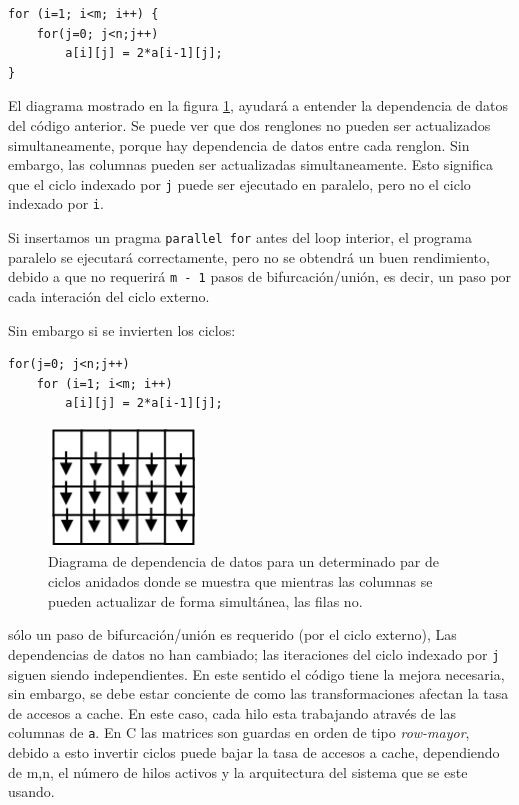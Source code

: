 \documentclass[12pt,letterpaper]{book}
\begin{document}
\begin{lstlisting}[style=C]
for (i=1; i<m; i++) {
	for(j=0; j<n;j++) 
		a[i][j] = 2*a[i-1][j];
}
\end{lstlisting}

El diagrama mostrado en la figura \ref{fig:data_dependence}, ayudará a entender la dependencia de datos del código anterior. Se puede ver que dos renglones no pueden ser actualizados simultaneamente, porque hay dependencia de datos entre cada renglon. Sin embargo, las columnas pueden ser actualizadas simultaneamente.  Esto significa que el ciclo indexado por \texttt{j} puede ser ejecutado en paralelo, pero no el ciclo indexado por \texttt{i}.

Si insertamos un pragma \texttt{parallel for} antes del loop interior, el programa paralelo se ejecutará correctamente, pero no se obtendrá un buen rendimiento, debido a que no requerirá \texttt{m - 1} pasos de bifurcación/unión, es decir, un paso por cada interación del ciclo externo.

Sin embargo si se invierten los ciclos:

\begin{lstlisting}[style=C]
for(j=0; j<n;j++) 
	for (i=1; i<m; i++) 
		a[i][j] = 2*a[i-1][j];
\end{lstlisting}

\begin{figure}
\begin{center}
\includegraphics[width=4cm]{../imagenes/data_dependence.png} 
\end{center}
\caption{Diagrama de dependencia de datos para un determinado par de ciclos anidados donde se muestra que mientras las columnas se pueden actualizar de forma simultánea, las filas no.}
\label{fig:data_dependence}
\end{figure}

sólo un paso de bifurcación/unión es requerido (por el ciclo externo), Las dependencias de datos no han cambiado; las iteraciones del ciclo indexado por \texttt{j} siguen siendo independientes. En este sentido el código tiene la mejora necesaria, sin embargo, se debe estar conciente de como las transformaciones afectan la tasa de accesos a cache. En este caso, cada hilo esta trabajando através de las columnas de \texttt{a}. En C las matrices son guardas en orden de tipo \textit{row-mayor}, debido a esto invertir ciclos puede bajar la tasa de accesos a cache, dependiendo  de m,n, el número de hilos activos  y la arquitectura del sistema que se este usando.
\end{document}
